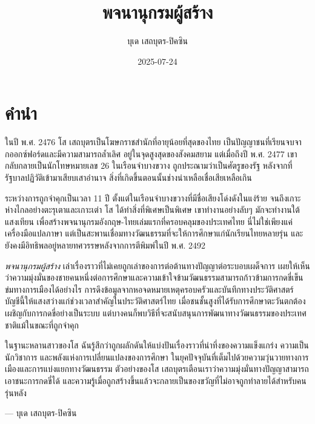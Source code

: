 \documentclass[
  Letterpaper,
]{scrbook}
\title{พจนานุกรมผู้สร้าง}
\author{บุเด เสถบุตร-ปิคซิน}
\date{2025-07-24}
\renewcommand*\contentsname{Table of contents}
\newcommand\contentsname{Table of contents}
\begin{document}
\frontmatter
\maketitle

\renewcommand*\contentsname{Table of contents}
{
\setcounter{tocdepth}{1}
\tableofcontents
}

\mainmatter
{}

\chapter*{คำนำ}\label{uxe04uxe33uxe19uxe33}


ในปี พ.ศ. 2476 โส เสถบุตรเป็นโฆษกราชสำนักที่อายุน้อยที่สุดของไทย
เป็นปัญญาชนที่เรียนจบจากออกซ์ฟอร์ดและมีความสามารถล้ำเลิศ อยู่ในจุดสูงสุดของสังคมสยาม
แต่เมื่อถึงปี พ.ศ. 2477 เขากลับกลายเป็นนักโทษหมายเลข 26 ในเรือนจำบางขวาง
ถูกประณามว่าเป็นศัตรูของรัฐ หลังจากที่รัฐบาลปฏิวัติเข้ามาเสียบเสาอำนาจ
สิ่งที่เกิดขึ้นตอนนั้นช่างน่าเหลือเชื่อเสียเหลือเกิน

ระหว่างการถูกจำคุกเป็นเวลา 11 ปี ตั้งแต่ในเรือนจำบางขวางที่มีชื่อเสียงโด่งดังในแง่ร้าย
จนถึงเกาะห่างไกลอย่างตะรุเตาและเกาะเต่า โส ได้ทำสิ่งที่พิเศษเป็นพิเศษ เขาทำงานอย่างลับๆ
มักจะทำงานใต้แสงเทียน เพื่อสร้างพจนานุกรมอังกฤษ-ไทยเล่มแรกที่ครอบคลุมของประเทศไทย
นี่ไม่ใช่เพียงแค่เครื่องมือแปลภาษา
แต่เป็นสะพานเชื่อมทางวัฒนธรรมที่จะให้การศึกษาแก่นักเรียนไทยหลายรุ่น
และยังคงมีอิทธิพลอยู่หลายทศวรรษหลังจากการตีพิมพ์ในปี พ.ศ. 2492

\emph{พจนานุกรมผู้สร้าง}
เล่าเรื่องราวที่ไม่เคยถูกเล่าของการต่อต้านทางปัญญาต่อระบอบเผด็จการ
เผยให้เห็นว่าความมุ่งมั่นของชายคนหนึ่งต่อการศึกษาและความเข้าใจข้ามวัฒนธรรมสามารถก้าวข้ามการกดขี่เข็นข่มทางการเมืองได้อย่างไร
การดึงข้อมูลจากหอจดหมายเหตุครอบครัวและบันทึกทางประวัติศาสตร์
บัญชีนี้ให้แสงสว่างแก่ช่วงเวลาสำคัญในประวัติศาสตร์ไทย
เมื่อชนชั้นสูงที่ได้รับการศึกษาตะวันตกต้องเผชิญกับการกดขี่อย่างเป็นระบบ
แต่บางคนก็พบวิธีที่จะสนับสนุนการพัฒนาทางวัฒนธรรมของประเทศชาติแม้ในขณะที่ถูกจำคุก

ในฐานะหลานสาวของโส ฉันรู้สึกว่าถูกผลักดันให้แบ่งปันเรื่องราวที่น่าทึ่งของความแข็งแกร่ง
ความเป็นนักวิชาการ และพลังแห่งการเปลี่ยนแปลงของการศึกษา
ในยุคปัจจุบันที่เต็มไปด้วยความวุ่นวายทางการเมืองและการแบ่งแยกทางวัฒนธรรม ตัวอย่างของโส
เสถบุตรเตือนเราว่าความมุ่งมั่นทางปัญญาสามารถเอาชนะการกดขี่ได้
และความรู้เมื่อถูกสร้างขึ้นแล้วจะกลายเป็นของขวัญที่ไม่อาจถูกทำลายได้สำหรับคนรุ่นหลัง

--- บุเด เสถบุตร-ปิคซิน
\end{document}
